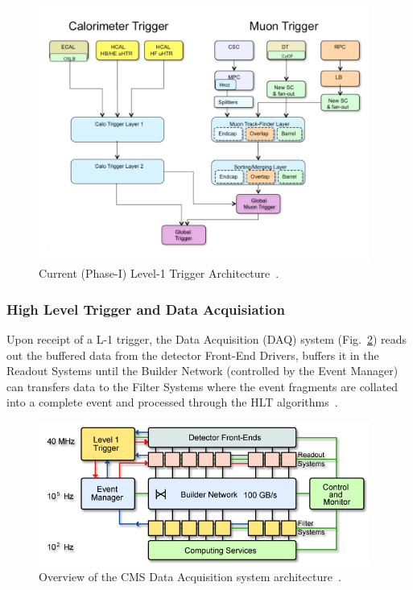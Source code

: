 \begin{figure}[htbp]
\begin{center}
\includegraphics[width=0.97\textwidth]{figs/cms/TrigUpgradeBlockDiagram.pdf}
\caption{Current (Phase-I) Level-1 Trigger Architecture~\cite{Tapper:2013yva}.}
\label{fig:trigger}
\end{center}
\end{figure}

\subsubsection{High Level Trigger and Data Acquisiation}\label{paragraph:HLT}
Upon receipt of a L-1 trigger, the Data Acquisition (DAQ) system (Fig.~\ref{fig:DAQ}) reads out the buffered data from the detector Front-End Drivers, buffers it in the Readout Systems until the Builder Network (controlled by the Event Manager) can transfers data to the Filter Systems where the event fragments are collated into a complete event and processed through the HLT algorithms~\cite{Sphicas:2002gg}. 

\begin{figure}[htbp]
\begin{center}
\includegraphics[width=0.97\textwidth]{figs/cms/CMS_DAQ.jpg}
\caption{Overview of the CMS Data Acquisition system architecture~\cite{Sphicas:2002gg}.}
\label{fig:DAQ}
\end{center}
\end{figure}

